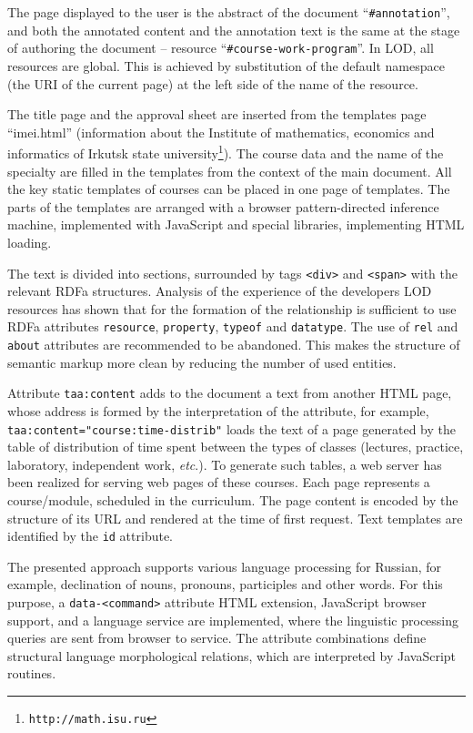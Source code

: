 \documentclass[conference,a4paper]{IEEEtran}
\providecommand\url[1]{\texttt{#1}}
\begin{document}
The page displayed to the user is the abstract of the document ``\texttt{\#annotation}'', and both the annotated content and the annotation text is the same at the stage of authoring the document -- resource ``\texttt{\#course-work-program}''.  In LOD, all resources are global.  This is achieved by substitution of the default namespace (the URI of the current page) at the left side of the name of the resource.

The title page and the approval sheet are inserted from the templates page ``imei.html'' (information about the Institute of mathematics, economics and informatics of Irkutsk state university\footnote{\url{http://math.isu.ru}}).  The course data and the name of the specialty are filled in the templates from the context of the main document.  All the key static templates of courses can be placed in one page of templates.  The parts of the templates are arranged with a browser pattern-directed inference machine, implemented with JavaScript and special libraries, implementing HTML loading.

The text is divided into sections, surrounded by tags \texttt{<div>} and \texttt{<span>} with the relevant RDFa structures.  Analysis of the experience of the developers LOD resources has shown that for the formation of the relationship is sufficient to use RDFa attributes \texttt{resource}, \texttt{property}, \texttt{typeof} and \texttt{datatype}.  The use of \texttt{rel} and \texttt{about} attributes are recommended to be abandoned.  This makes the structure of semantic markup more clean by reducing the number of used entities.

Attribute \texttt{taa:content} adds to the document a text from another HTML page, whose address is formed by the interpretation of the attribute, for example, \texttt{taa:content="course:time-distrib"} loads the text of a page generated by the table of distribution of time spent between the types of classes (lectures, practice, laboratory, independent work, \emph{etc}.).  To generate such tables, a web server has been realized for serving web pages of these courses. Each page represents a course/module, scheduled in the curriculum.  The page content is encoded by the structure of its URL and rendered at the time of first request.  Text templates are identified by the \texttt{id} attribute.

The presented approach supports various language processing for Russian, for example, declination of nouns, pronouns, participles and other words.  For this purpose, a \texttt{data-<command>} attribute HTML extension, JavaScript browser support, and a language service are implemented, where the linguistic processing queries are sent from browser to  service.  The attribute combinations define structural language morphological relations, which are interpreted by JavaScript routines.
\end{document}
